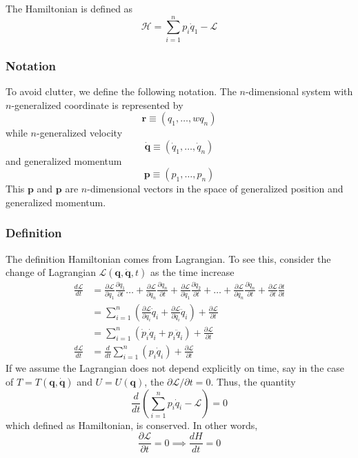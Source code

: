 \documentclass[../../../main.tex]{subfiles}
\begin{document}
The Hamiltonian is defined as 
\begin{equation*}
    \mathcal{H}=\sum_{i=1}^{n}p_i\dot{q}_1-\mathcal{L}
\end{equation*}

\subsubsection*{Notation}
To avoid clutter, we define the following notation.
The $n$-dimensional system with $n$-generalized coordinate is represented by 
\begin{equation*}
    \mathbf{r}\equiv(q_1,\dots,wq_n)
\end{equation*}
while $n$-generalized velocity
\begin{equation*}
    \dot{\mathbf{q}}\equiv(\dot{q}_1,\dots,\dot{q}_n)
\end{equation*}
and generalized momentum
\begin{equation*}
    \mathbf{p}\equiv(p_1,\dots,p_n)
\end{equation*}
This $\mathbf{p}$ and $\mathbf{p}$ are $n$-dimensional vectors in the space of generalized position and generalized momentum.

\subsubsection*{Definition}
The definition Hamiltonian comes from Lagrangian.
To see this, consider the change of Lagrangian $\mathcal{L}(\mathbf{q},\dot{\mathbf{q}},t)$ as the time increase
\begin{align*}
    \frac{d\mathcal{L}}{dt}&=\frac{\partial\mathcal{L}}{\partial q_1}\frac{\partial q_1}{\partial t}\dots+\frac{\partial\mathcal{L}}{\partial q_n}\frac{\partial q_n}{\partial t}+\frac{\partial\mathcal{L}}{\partial \dot{q}_1}\frac{\partial \dot{q}_2}{\partial t}+\dots+\frac{\partial \mathcal{L}}{\partial \dot{q_n}}\frac{\partial\dot{q}_n}{\partial t}+\frac{\partial\mathcal{L}}{\partial t}\frac{\partial t}{\partial t}\\
    &=\sum_{i=1}^{n}\left(\frac{\partial \mathcal{L}}{\partial q_i}\dot{q}_i+\frac{\partial\mathcal{L}}{\partial\dot{q}_i}\ddot{q}_i\right)+\frac{\partial \mathcal{L}}{\partial t}\\
    &=\sum_{i=1}^{n}\left(\dot{p}_i\dot{q}_i+p_i\ddot{q}_i\right)+\frac{\partial \mathcal{L}}{\partial t}\\
    \frac{d\mathcal{L}}{dt}&=\frac{d}{dt}\sum_{i=1}^{n}\left(p_i\dot{q}_i\right)+\frac{\partial\mathcal{L}}{\partial t}
\end{align*}
If we assume the Lagrangian does not depend explicitly on time, say in the case of $T=T(\mathbf{q},\dot{\mathbf{q}})$ and $U=U(\mathbf{q})$, the $\partial\mathcal{L}/\partial t=0$. 
Thus, the quantity
\begin{equation*}
    \frac{d}{dt}\left(\sum_{i=1}^{n}p_i\dot{q}_i-\mathcal{L}\right)=0
\end{equation*}
which defined as Hamiltonian, is conserved. In other words,
\begin{equation*}
    \frac{\partial\mathcal{L}}{\partial t}=0\implies\frac{dH}{dt}=0
\end{equation*}
\end{document}
